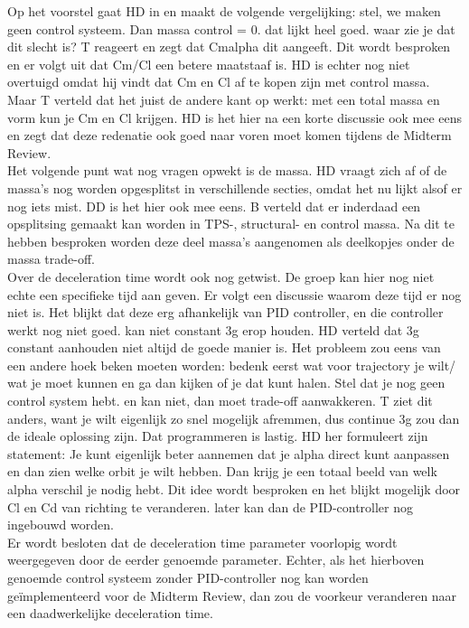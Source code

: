 Op het voorstel gaat HD in en maakt de volgende vergelijking: stel, we maken geen control systeem. Dan massa control = 0. dat lijkt heel goed. waar zie je dat dit slecht is? T reageert en zegt dat Cmalpha dit aangeeft. Dit wordt besproken en er volgt uit dat Cm/Cl een betere maatstaaf is. HD is echter nog niet overtuigd omdat hij vindt dat Cm en Cl af te kopen zijn met control massa. Maar T verteld dat het juist de andere kant op werkt: met een total massa en vorm kun je Cm en Cl krijgen. HD is het hier na een korte discussie ook mee eens en zegt dat deze redenatie ook goed naar voren moet komen tijdens de Midterm Review.\\

Het volgende punt wat nog vragen opwekt is de massa. HD vraagt zich af of de massa's nog worden opgesplitst in verschillende secties, omdat het nu lijkt alsof er nog iets mist. DD is het hier ook mee eens. B verteld dat er inderdaad een opsplitsing gemaakt kan worden in TPS-, structural- en control massa. Na dit te hebben besproken worden deze deel massa's aangenomen als deelkopjes onder de massa trade-off.\\

 Over de deceleration time wordt ook nog getwist. De groep kan hier nog niet echte een specifieke tijd aan geven. Er volgt een discussie waarom deze tijd er nog niet is. Het blijkt dat deze erg afhankelijk van PID controller, en die controller werkt nog niet goed. kan niet constant 3g erop houden. HD verteld dat 3g constant aanhouden niet altijd de goede manier is. Het probleem zou eens van een andere hoek beken moeten worden: bedenk eerst wat voor trajectory je wilt/ wat je moet kunnen en ga dan kijken of je dat kunt halen. Stel dat je nog geen control system hebt. en kan niet, dan moet trade-off aanwakkeren. T ziet dit anders, want je wilt eigenlijk zo snel mogelijk afremmen, dus continue 3g zou dan de ideale oplossing zijn. Dat programmeren is lastig. HD her formuleert zijn statement: Je kunt eigenlijk beter aannemen dat je alpha direct kunt aanpassen en dan zien welke orbit je wilt hebben. Dan krijg je een totaal beeld van welk alpha verschil je nodig hebt. Dit idee wordt besproken en het blijkt mogelijk door Cl en Cd van richting te veranderen. later kan dan de PID-controller nog ingebouwd worden.\\
 
Er wordt besloten dat de deceleration time parameter voorlopig wordt weergegeven door de eerder genoemde parameter. Echter, als het hierboven genoemde control systeem zonder PID-controller nog kan worden geïmplementeerd voor de Midterm Review, dan zou de voorkeur veranderen naar een daadwerkelijke deceleration time.\\

